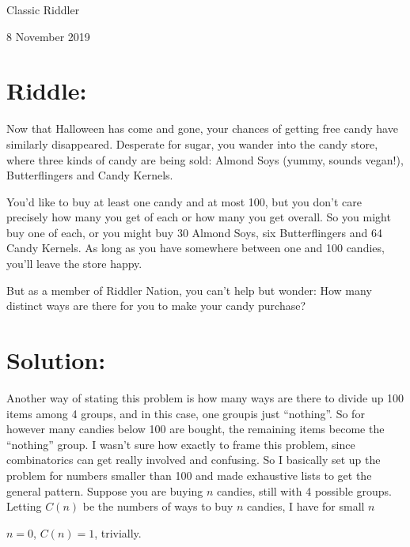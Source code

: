 \documentclass{article}
\begin{document}
\pagestyle{empty} %

\begin{center}
{\LARGE Classic Riddler}

\vspace{0.15in}

{\Large 8 November 2019}
\end{center}


\section*{Riddle:}

Now that Halloween has come and gone, your chances of getting free candy have similarly disappeared.
Desperate for sugar, you wander into the candy store, where three kinds of candy are being sold: Almond Soys (yummy, sounds vegan!), Butterflingers and Candy Kernels.

You’d like to buy at least one candy and at most 100, but you don’t care precisely how many you get of each or how many you get overall.
So you might buy one of each, or you might buy 30 Almond Soys, six Butterflingers and 64 Candy Kernels.
As long as you have somewhere between one and 100 candies, you’ll leave the store happy.

But as a member of Riddler Nation, you can’t help but wonder: How many distinct ways are there for you to make your candy purchase?


\section*{Solution:}

Another way of stating this problem is how many ways are there to divide up 100 items among 4 groups, and in this case, one groupis just ``nothing''.
So for however many candies below 100 are bought, the remaining items become the ``nothing'' group.
I wasn't sure how exactly to frame this problem, since combinatorics can get really involved and confusing.
So I basically set up the problem for numbers smaller than 100 and made exhaustive lists to get the general pattern.
Suppose you are buying $n$ candies, still with 4 possible groups.
Letting $C(n)$ be the numbers of ways to buy $n$ candies, I have for small $n$

\vspace{0.2in}

$n=0$, $C(n)=1$, trivially.

\vspace{0.2in}
\end{document}

